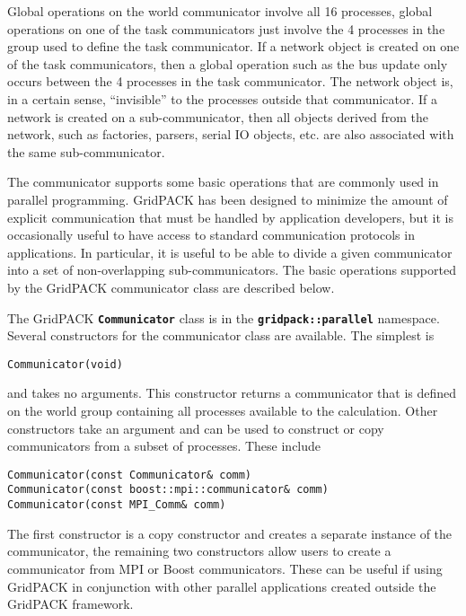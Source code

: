 
Global operations on the world communicator involve all 16 processes, global operations on one of the task communicators just involve the 4 processes in the group used to define the task communicator. If a network object is created on one of the task communicators, then a global operation such as the bus update only occurs between the 4 processes in the task communicator. The network object is, in a certain sense, ``invisible'' to the processes outside that communicator. If a network is created on a sub-communicator, then all objects derived from the network, such as factories, parsers, serial IO objects, etc. are also associated with the same sub-communicator.

The communicator supports some basic operations that are commonly used in parallel programming. GridPACK has been designed to minimize the amount of explicit communication that must be handled by application developers, but it is occasionally useful to have access to standard communication protocols in applications. In particular, it is useful to be able to divide a given communicator into a set of non-overlapping sub-communicators. The basic operations supported by the GridPACK communicator class are described below.

The GridPACK \texttt{\textbf{Communicator}} class is in the
\texttt{\textbf{gridpack::parallel}} namespace. Several constructors for the
communicator class are available. The simplest is

{
\color{red}
\begin{Verbatim}[fontseries=b]
Communicator(void)
\end{Verbatim}
}

and takes no arguments. This constructor returns a communicator that is defined
on the world group containing all processes available to the calculation. Other
constructors take an argument and can be used to construct or copy communicators
from a subset of processes. These include

{
\color{red}
\begin{Verbatim}[fontseries=b]
Communicator(const Communicator& comm)
Communicator(const boost::mpi::communicator& comm)
Communicator(const MPI_Comm& comm)
\end{Verbatim}
}

The first constructor is a copy constructor and creates a separate instance of
the communicator, the remaining two constructors allow users to create a
communicator from MPI or Boost communicators. These can be useful if using
GridPACK in conjunction with other parallel applications created outside the
GridPACK framework.


